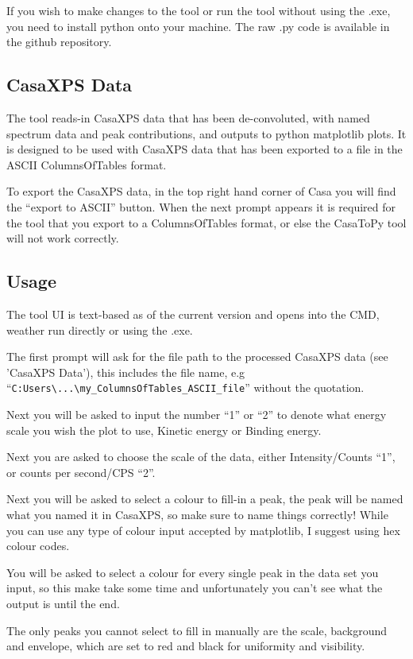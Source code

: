 \documentclass[10pt]{report}
\begin{document}
If you wish to make changes to the tool or run the tool without using the .exe, you need to install python onto your machine. The raw .py code is available in the github repository.

\subsection{CasaXPS Data}

The tool reads-in CasaXPS data that has been de-convoluted, with named spectrum data and peak contributions, and outputs to python matplotlib plots. It is designed to be used with CasaXPS data that has been exported to a file in the ASCII ColumnsOfTables format. 

To export the CasaXPS data, in the top right hand corner of Casa you will find the ``export to ASCII'' button. When the next prompt appears it is required for the tool that you export to a ColumnsOfTables format, or else the CasaToPy tool will not work correctly.

\subsection{Usage}

The tool UI is text-based as of the current version and opens into the CMD, weather run directly or using the .exe.

The first prompt will ask for the file path to the processed CasaXPS data (see 'CasaXPS Data'), this includes the file name, e.g ``\verb|C:Users\...\my_ColumnsOfTables_ASCII_file|'' without the quotation.

Next you will be asked to input the number ``1'' or ``2'' to denote what energy scale you wish the plot to use, Kinetic energy or Binding energy. 

Next you are asked to choose the scale of the data, either Intensity/Counts ``1'', or counts per second/CPS ``2''.

Next you will be asked to select a colour to fill-in a peak, the peak will be named what you named it in CasaXPS, so make sure to name things correctly! While you can use any type of colour input accepted by matplotlib, I suggest using hex colour codes. 

You will be asked to select a colour for every single peak in the data set you input, so this make take some time and unfortunately you can't see what the output is until the end.

The only peaks you cannot select to fill in manually are the scale, background and envelope, which are set to red and black for uniformity and visibility.
\end{document}
